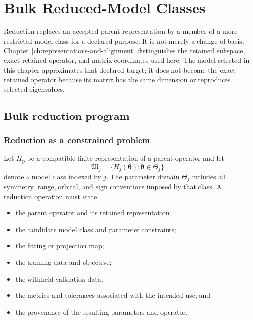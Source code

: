 \chapter{Bulk Reduced-Model Classes}

\label{ch:model-reduction}


Reduction replaces an accepted parent representation by a member of a more
restricted model class for a declared purpose. It is not merely a change of
basis. Chapter~\ref{ch:representations-and-alignment} distinguishes the retained
subspace, exact retained operator, and matrix coordinates used here. The model
selected in this chapter approximates that declared target; it does not become
the exact retained operator because its matrix has the same dimension or
reproduces selected eigenvalues.

\section{Bulk reduction program}

\subsection{Reduction as a constrained problem}


Let $H_{\mathrm p}$ be a compatible finite representation of a parent operator
and let
\begin{equation}
  \mathfrak M_j
  =
  \{H_j(\boldsymbol\theta):\boldsymbol\theta\in\Theta_j\}
\end{equation}
denote a model class indexed by $j$. The parameter domain $\Theta_j$ includes
all symmetry, range, orbital, and sign conventions imposed by that class. A
reduction operation must state

\begin{itemize}
  \item the parent operator and its retained representation;
  \item the candidate model class and parameter constraints;
  \item the fitting or projection map;
  \item the training data and objective;
  \item the withheld validation data;
  \item the metrics and tolerances associated with the intended use; and
  \item the provenance of the resulting parameters and operator.
\end{itemize}

